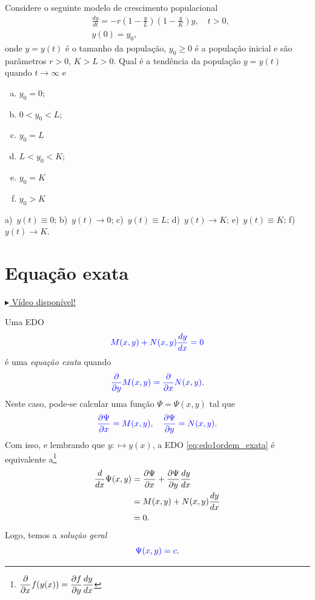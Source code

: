 \begin{exer}
  Considere o seguinte modelo de crescimento populacional
  \begin{align*}
    &\frac{dy}{dt} = -r\left(1 - \frac{y}{L}\right)\left(1 - \frac{y}{K}\right)y,\quad t>0,\\
    &y(0) = y_0,
  \end{align*}
  onde $y = y(t)$ é o tamanho da população, $y_0 \geq 0$ é a população inicial e são parâmetros $r > 0$, $K>L>0$. Qual é a tendência da população $y = y(t)$ quando $t\to\infty$ e
  \begin{enumerate}[a)]
  \item $y_0 = 0$;
  \item $0 < y_0 < L$;
  \item $y_0 = L$
  \item $L < y_0 < K$;
  \item $y_0 = K$
  \item $y_0 > K$
  \end{enumerate}
\end{exer}
\begin{resp}
  a)~$y(t) \equiv 0$; b)~$y(t)\to 0$; c)~$y(t)\equiv L$; d)~$y(t)\to K$; e)~$y(t)\equiv K$; f)~$y(t)\to K$.
\end{resp}

\section{Equação exata}\label{cap_edo1ordem_sec_eqexata}

\begin{flushright}
  \href{https://archive.org/details/edo-ordem-1-exata}{$\blacktriangleright$ Vídeo disponível!}
\end{flushright}

Uma EDO
\begin{equation}\label{eq:edo1ordem_exata}
  {\color{blue} M(x,y) + N(x,y)\frac{dy}{dx} = 0}
\end{equation}
é uma \emph{equação exata} quando
\begin{equation}
  {\color{blue} \frac{\partial}{\partial y}M(x,y) = \frac{\partial}{\partial x}N(x,y)}.
\end{equation}
Neste caso, pode-se calcular uma função $\Psi = \Psi(x,y)$ tal que
\begin{equation}
  {\color{blue}\frac{\partial\Psi}{\partial x} = M(x,y),\quad\frac{\partial\Psi}{\partial y} = N(x,y)}.
\end{equation}
Com isso, e lembrando que $y:\mapsto y(x)$, a EDO \eqref{eq:edo1ordem_exata} é equivalente a\footnote{$\displaystyle \frac{\partial}{\partial x}f(y(x)) = \frac{\partial f}{\partial y}\frac{d y}{dx}$}
\begin{align}
  \frac{d}{dx}\Psi(x,y) &= \frac{\partial\Psi}{\partial x} + \frac{\partial\Psi}{\partial y}\frac{dy}{dx} \\
                        &= M(x,y) + N(x,y)\frac{dy}{dx} \\
                        &= 0.
\end{align}
Logo, temos a \emph{solução geral}
\begin{equation}
  {\color{blue}\Psi(x,y) = c}.
\end{equation}

